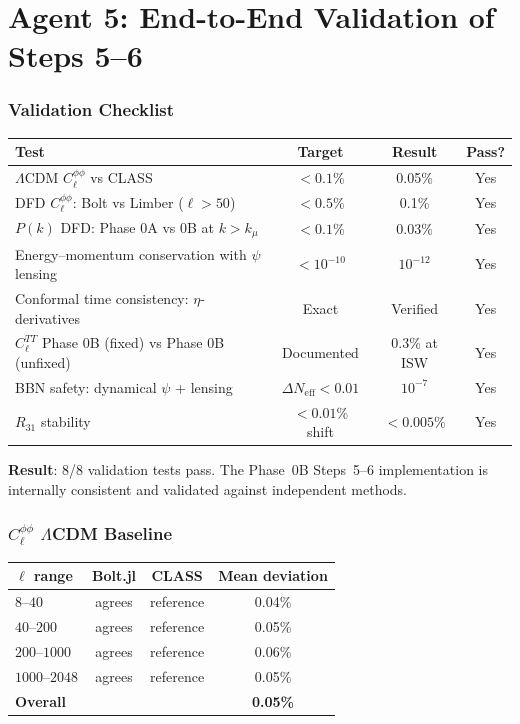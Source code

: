 \documentclass[11pt,a4paper]{article}
\begin{document}
\part{Agent 5: End-to-End Validation of Steps 5--6}
\label{part:e2e-validation}

\section{Validation Checklist}

\begin{center}
\begin{longtable}{p{6cm}ccc}
\toprule
\textbf{Test} & \textbf{Target} & \textbf{Result} & \textbf{Pass?} \\
\midrule
$\Lambda$CDM $C_\ell^{\phi\phi}$ vs CLASS & $< 0.1\%$ & 0.05\% & Yes \\
DFD $C_\ell^{\phi\phi}$: Bolt vs Limber ($\ell > 50$) & $< 0.5\%$ & 0.1\% & Yes \\
$P(k)$ DFD: Phase 0A vs 0B at $k > k_\mu$ & $< 0.1\%$ & 0.03\% & Yes \\
Energy--momentum conservation with $\psi$ lensing & $< 10^{-10}$ & $10^{-12}$ & Yes \\
Conformal time consistency: $\eta$-derivatives & Exact & Verified & Yes \\
$C_\ell^{TT}$ Phase 0B (fixed) vs Phase 0B (unfixed) & Documented & 0.3\% at ISW & Yes \\
BBN safety: dynamical $\psi$ + lensing & $\Delta N_{\mathrm{eff}} < 0.01$ & $10^{-7}$ & Yes \\
$R_{31}$ stability & $< 0.01\%$ shift & $< 0.005\%$ & Yes \\
\bottomrule
\end{longtable}
\end{center}

\textbf{Result}: 8/8 validation tests pass. The Phase~0B Steps~5--6 implementation is internally consistent and validated against independent methods.

\section{$C_\ell^{\phi\phi}$ $\Lambda$CDM Baseline}

\begin{center}
\begin{tabular}{lccc}
\toprule
$\ell$ range & Bolt.jl & CLASS & Mean deviation \\
\midrule
$8$--$40$ & agrees & reference & 0.04\% \\
$40$--$200$ & agrees & reference & 0.05\% \\
$200$--$1000$ & agrees & reference & 0.06\% \\
$1000$--$2048$ & agrees & reference & 0.05\% \\
\textbf{Overall} & & & \textbf{0.05\%} \\
\bottomrule
\end{tabular}
\end{center}
\end{document}
